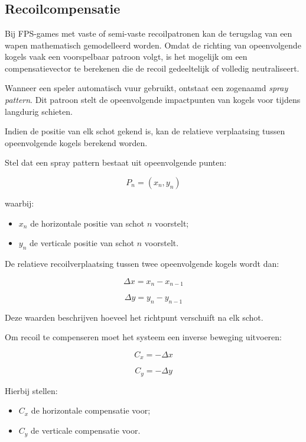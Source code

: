 \chapter{}
\label{ch:Recoilcompensatie}

\section{Recoilcompensatie}

Bij FPS-games met vaste of semi-vaste recoilpatronen kan de terugslag van een wapen mathematisch gemodelleerd worden. Omdat de richting van opeenvolgende kogels vaak een voorspelbaar patroon volgt, is het mogelijk om een compensatievector te berekenen die de recoil gedeeltelijk of volledig neutraliseert.

Wanneer een speler automatisch vuur gebruikt, ontstaat een zogenaamd \textit{spray pattern}. Dit patroon stelt de opeenvolgende impactpunten van kogels voor tijdens langdurig schieten.

Indien de positie van elk schot gekend is, kan de relatieve verplaatsing tussen opeenvolgende kogels berekend worden.

Stel dat een spray pattern bestaat uit opeenvolgende punten:

\[
P_n = (x_n, y_n)
\]

waarbij:
\begin{itemize}
    \item \(x_n\) de horizontale positie van schot \(n\) voorstelt;
    \item \(y_n\) de verticale positie van schot \(n\) voorstelt.
\end{itemize}

De relatieve recoilverplaatsing tussen twee opeenvolgende kogels wordt dan:

\[
\Delta x = x_n - x_{n-1}
\]

\[
\Delta y = y_n - y_{n-1}
\]

\newpage

Deze waarden beschrijven hoeveel het richtpunt verschuift na elk schot.

Om recoil te compenseren moet het systeem een inverse beweging uitvoeren:

\[
C_x = -\Delta x
\]

\[
C_y = -\Delta y
\]

Hierbij stellen:
\begin{itemize}
    \item \(C_x\) de horizontale compensatie voor;
    \item \(C_y\) de verticale compensatie voor.
\end{itemize}


